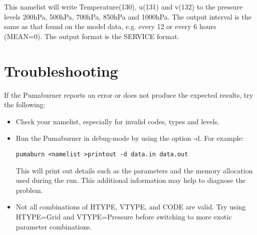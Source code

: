     This namelist will write Temperature(130), u(131) and v(132)
    to the pressure levels 200hPa, 500hPa, 700hPa, 850hPa and 1000hPa.
    The output interval is the same as that found on the model data,
    e.g. every 12 or every 6 hours (MEAN=0). The output format
    is the SERVICE format.

\section{Troubleshooting}
If the Pumaburner reports an error or does not produce 
the expected results, try the following:

\begin{itemize}

\item Check your namelist, especially for invalid codes, types and levels.

\item Run the Pumaburner in debug-mode by using the option -d.
For example:
\begin{verbatim}
pumaburn <namelist >printout -d data.in data.out
\end{verbatim}

This will print out details such as the parameters and the memory allocation used
during the run. This additional information may help to diagnose the problem.

\item Not all combinations of HTYPE, VTYPE, and CODE are valid.
Try using HTYPE=Grid and VTYPE=Pressure before switching to more
exotic parameter combinations.

\end{itemize}


